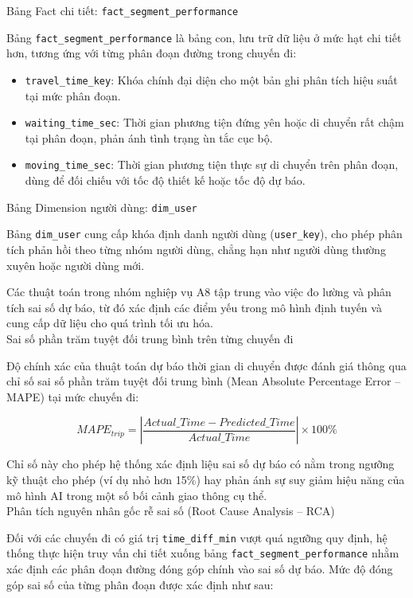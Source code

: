 Bảng Fact chi tiết: \texttt{fact\_segment\_performance}

Bảng \texttt{fact\_segment\_performance} là bảng con, lưu trữ dữ liệu ở mức hạt chi tiết hơn, tương ứng với từng phân đoạn đường trong chuyến đi:

\begin{itemize}
    \item \texttt{travel\_time\_key}: Khóa chính đại diện cho một bản ghi phân tích hiệu suất tại mức phân đoạn.
    \item \texttt{waiting\_time\_sec}: Thời gian phương tiện đứng yên hoặc di chuyển rất chậm tại phân đoạn, phản ánh tình trạng ùn tắc cục bộ.
    \item \texttt{moving\_time\_sec}: Thời gian phương tiện thực sự di chuyển trên phân đoạn, dùng để đối chiếu với tốc độ thiết kế hoặc tốc độ dự báo.
\end{itemize}

Bảng Dimension người dùng: \texttt{dim\_user}

Bảng \texttt{dim\_user} cung cấp khóa định danh người dùng (\texttt{user\_key}), cho phép phân tích phản hồi theo từng nhóm người dùng, chẳng hạn như người dùng thường xuyên hoặc người dùng mới.


Các thuật toán trong nhóm nghiệp vụ A8 tập trung vào việc đo lường và phân tích sai số dự báo, từ đó xác định các điểm yếu trong mô hình định tuyến và cung cấp dữ liệu cho quá trình tối ưu hóa.\\

Sai số phần trăm tuyệt đối trung bình trên từng chuyến đi

Độ chính xác của thuật toán dự báo thời gian di chuyển được đánh giá thông qua chỉ số sai số phần trăm tuyệt đối trung bình (Mean Absolute Percentage Error -- MAPE) tại mức chuyến đi:

\[
MAPE_{trip} = \left| \frac{Actual\_Time - Predicted\_Time}{Actual\_Time} \right| \times 100\%
\]

Chỉ số này cho phép hệ thống xác định liệu sai số dự báo có nằm trong ngưỡng kỹ thuật cho phép (ví dụ nhỏ hơn 15\%) hay phản ánh sự suy giảm hiệu năng của mô hình AI trong một số bối cảnh giao thông cụ thể.\\

Phân tích nguyên nhân gốc rễ sai số (Root Cause Analysis -- RCA)

Đối với các chuyến đi có giá trị \texttt{time\_diff\_min} vượt quá ngưỡng quy định, hệ thống thực hiện truy vấn chi tiết xuống bảng \texttt{fact\_segment\_performance} nhằm xác định các phân đoạn đường đóng góp chính vào sai số dự báo. Mức độ đóng góp sai số của từng phân đoạn được xác định như sau:

